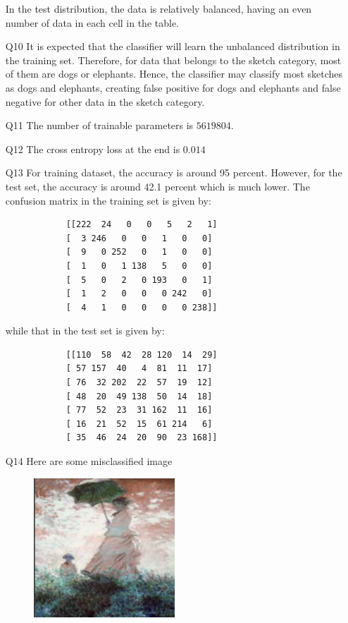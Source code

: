 \documentclass{article}
\begin{document}
\begin{enumerate}
		In the test distribution, the data is relatively balanced, having an even number of data in each cell in the table.
	\item[Q10] It is expected that the classifier will learn the unbalanced distribution in the training set. Therefore, for data that belongs to the sketch category, most of them are dogs or elephants. Hence, the classifier may classify most sketches as dogs and elephants, creating false positive for dogs and elephants and false negative for other data in the sketch category.
	\item[Q11] The number of trainable parameters is $5619804$.
	\item[Q12] The cross entropy loss at the end is $0.014$
	\item[Q13] For training dataset, the accuracy is around 95 percent. However, for the test set, the accuracy is around 42.1 percent which is much lower. The confusion matrix in the training set is given by:
		\begin{verbatim}
			[[222  24   0   0   5   2   1]
			[  3 246   0   0   1   0   0]
			[  9   0 252   0   1   0   0]
			[  1   0   1 138   5   0   0]
			[  5   0   2   0 193   0   1]
			[  1   2   0   0   0 242   0]
			[  4   1   0   0   0   0 238]]
		\end{verbatim}
		while that in the test set is given by:
		\begin{verbatim}
			[[110  58  42  28 120  14  29]
			[ 57 157  40   4  81  11  17]
			[ 76  32 202  22  57  19  12]
			[ 48  20  49 138  50  14  18]
			[ 77  52  23  31 162  11  16]
			[ 16  21  52  15  61 214   6]
			[ 35  46  24  20  90  23 168]]
		\end{verbatim}
	\item[Q14] Here are some misclassified image
		\begin{figure}[H]
			\centering
			\includegraphics[width=0.5\textwidth]{figures/4.png}
		\end{figure}

\end{enumerate}
\end{document}
